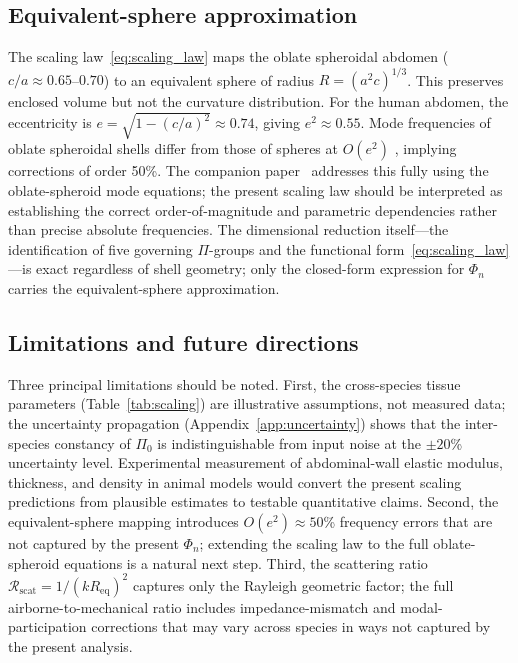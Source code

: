 \documentclass[review]{elsarticle}
\begin{document}
\subsection{Equivalent-sphere approximation}

The scaling law~\eqref{eq:scaling_law} maps the oblate spheroidal abdomen
($c/a \approx 0.65$--$0.70$) to an equivalent sphere of radius $R = (a^2
c)^{1/3}$.  This preserves enclosed volume but not the curvature
distribution.  For the human abdomen, the eccentricity is $e = \sqrt{1 -
(c/a)^2} \approx 0.74$, giving $e^2 \approx 0.55$.  Mode frequencies of
oblate spheroidal shells differ from those of spheres at $O(e^2)$
\cite{Soedel2004,Leissa1973}, implying corrections of order 50\%.  The
companion paper~\cite{Mace2026browntone} addresses this fully using the
oblate-spheroid mode equations; the present scaling law should be
interpreted as establishing the correct order-of-magnitude and parametric
dependencies rather than precise absolute frequencies.  The dimensional
reduction itself---the identification of five governing $\Pi$-groups and the
functional form~\eqref{eq:scaling_law}---is exact regardless of shell
geometry; only the closed-form expression for $\Phi_n$ carries the
equivalent-sphere approximation.

\subsection{Limitations and future directions}

Three principal limitations should be noted.  First, the cross-species
tissue parameters (Table~\ref{tab:scaling}) are illustrative assumptions,
not measured data; the uncertainty propagation (Appendix~\ref{app:uncertainty})
shows that the inter-species constancy of $\Pi_0$ is indistinguishable
from input noise at the $\pm 20$\% uncertainty level.  Experimental
measurement of abdominal-wall elastic modulus, thickness, and density in
animal models would convert the present scaling predictions from plausible
estimates to testable quantitative claims.  Second, the equivalent-sphere
mapping introduces $O(e^2) \approx 50$\% frequency errors that are not
captured by the present $\Phi_n$; extending the scaling law to the full
oblate-spheroid equations is a natural next step.  Third, the scattering
ratio $\mathcal{R}_\mathrm{scat} = 1/(kR_\mathrm{eq})^2$ captures only the
Rayleigh geometric factor; the full airborne-to-mechanical ratio includes
impedance-mismatch and modal-participation corrections that may vary across
species in ways not captured by the present analysis.
\end{document}
